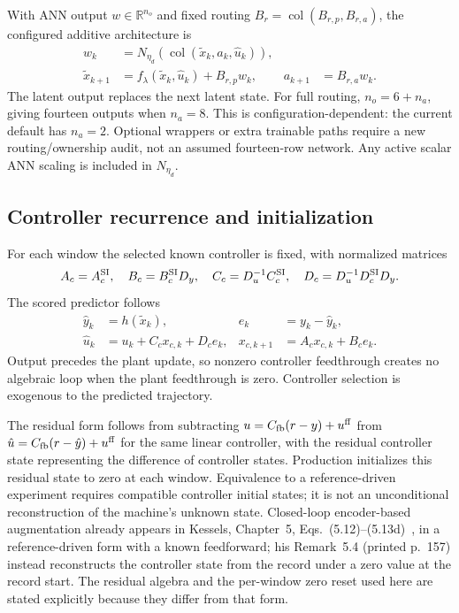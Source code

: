 \documentclass[11pt,a4paper]{article}
\newcommand{\R}{\mathbb R}
\newcommand{\col}{\operatorname{col}}
\theoremstyle{remark}
\begin{document}
With ANN output $w\in\R^{n_o}$ and fixed routing $B_r=\col(B_{r,p},B_{r,a})$, the configured additive architecture is
\begin{align}
 w_k&=N_{\eta_d}(\col(\tilde x_k,a_k,\hat u_k)),\nonumber\\
 \tilde x_{k+1}&=f_\lambda(\tilde x_k,\hat u_k)+B_{r,p}w_k,
 &a_{k+1}&=B_{r,a}w_k.\label{eq:gantry}
\end{align}
The latent output replaces the next latent state. For full routing, $n_o=6+n_a$, giving fourteen outputs when $n_a=8$. This is configuration-dependent: the current default has $n_a=2$. Optional wrappers or extra trainable paths require a new routing/ownership audit, not an assumed fourteen-row network. Any active scalar ANN scaling is included in $N_{\eta_d}$.

\subsection{Controller recurrence and initialization}
For each window the selected known controller is fixed, with normalized matrices
\begin{equation}
 A_c=A_c^{\rm SI},\quad B_c=B_c^{\rm SI}D_y,\quad
 C_c=D_u^{-1}C_c^{\rm SI},\quad D_c=D_u^{-1}D_c^{\rm SI}D_y.
\end{equation}
The scored predictor follows
\begin{align}
 \hat y_k&=h(\tilde x_k),&e_k&=y_k-\hat y_k,\nonumber\\
 \hat u_k&=u_k+C_c x_{c,k}+D_c e_k,&
 x_{c,k+1}&=A_c x_{c,k}+B_c e_k.\label{eq:controller}
\end{align}
Output precedes the plant update, so nonzero controller feedthrough creates no algebraic loop when the plant feedthrough is zero. Controller selection is exogenous to the predicted trajectory.

The residual form follows from subtracting $u=C_{\rm fb}(r-y)+u^{\rm ff}$ from $\hat u=C_{\rm fb}(r-\hat y)+u^{\rm ff}$ for the same linear controller, with the residual controller state representing the difference of controller states. Production initializes this residual state to zero at each window. Equivalence to a reference-driven experiment requires compatible controller initial states; it is not an unconditional reconstruction of the machine's unknown state. Closed-loop encoder-based augmentation already appears in Kessels, Chapter~5, Eqs.~(5.12)--(5.13d)~\cite{kessels2025}, in a reference-driven form with a known feedforward; his Remark~5.4 (printed p.~157) instead reconstructs the controller state from the record under a zero value at the record start. The residual algebra and the per-window zero reset used here are stated explicitly because they differ from that form.
\end{document}
